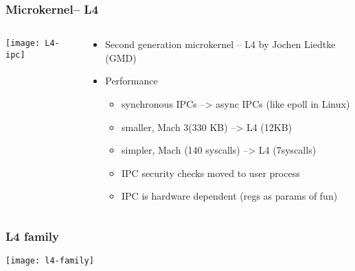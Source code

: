 \begin{frame}[plain]
    \frametitle{Microkernel-- L4}
    
    \begin{columns}
        
        \begin{column}{.4\textwidth}
            \centering
            \texttt{[image: L4-ipc]}
        \end{column}
        
        \begin{column}{.6\textwidth}
            
            \begin{itemize}
                \item Second generation microkernel -- L4 by Jochen Liedtke (GMD)
                \item Performance
                \begin{itemize}
                    \item synchronous IPCs  -->  async IPCs (like epoll in Linux)
                    \item smaller, Mach 3(330 KB) --> L4 (12KB)
                    \item simpler, Mach (140 syscalls) --> L4 (7syscalls)
                    \item IPC security checks moved to user process
                    \item IPC is hardware dependent (regs as params of fun)
                \end{itemize}		
            \end{itemize}	
            
        \end{column}
        
        
    \end{columns}
    
\end{frame}
\begin{frame}[plain]
	\frametitle{L4 family}
	
	\centering
	\texttt{[image: l4-family]}
	
\end{frame}



